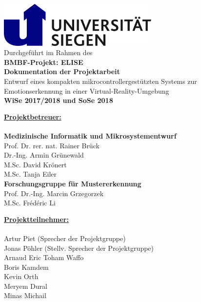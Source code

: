 
\begin{center}

\thispagestyle{empty}

	\includegraphics[width=8cm]{Images/uni-siegen-logo.png}
	\\
	\vspace*{1cm}
	\Large{Durchgeführt im Rahmen des}\\
	\Huge{\textbf{BMBF-Projekt: ELISE}}\\
	\vspace{1.0cm}
	\Huge{\textbf{Dokumentation der Projektarbeit}}\\
	\vspace{0.3cm}	
	\Large{Entwurf eines kompakten mikrocontrollergestützten Systems zur Emotionserkennung in einer Virtual-Reality-Umgebung}\\
\vspace{0.5cm}	
\Large{\textbf{WiSe 2017/2018 und SoSe 2018}}\\
\vspace{0.6cm}
\end{center}
	
\Large
\noindent
\underline{\textbf{Projektbetreuer:}}\\
\\
\noindent
\textbf{Medizinische Informatik und Mikrosystementwurf}\\
Prof. Dr. rer. nat. Rainer Brück\\
Dr.-Ing. Armin Grünewald\\
M.Sc. David Krönert\\
M.Sc. Tanja Eiler\\

\noindent
\textbf{Forschungsgruppe für Mustererkennung}\\
Prof. Dr.-Ing. Marcin Grzegorzek\\
M.Sc. Frédéric Li\\
\vspace*{1.2cm}

\noindent
\underline{\textbf{Projektteilnehmer:}}\\
\\
\noindent
Artur Piet (Sprecher der Projektgruppe)\\
Jonas Pöhler (Stellv. Sprecher der Projektgruppe)\\
Arnaud Eric Toham Waffo\\
Boris Kamdem\\
Kevin Orth\\
Meryem Dural\\
Minas Michail\\